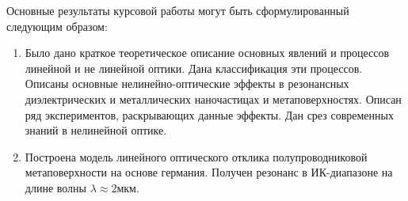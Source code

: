 

Основные результаты курсовой работы могут быть сформулированный следующим образом:
\begin{enumerate}
\item Было дано краткое теоретическое описание основных явлений и процессов линейной и не линейной оптики. Дана классификация эти процессов. Описаны основные нелинейно-оптические эффекты в резонансных диэлектрических и металлических наночастицах и метаповерхностях. Описан ряд экспериментов, раскрывающих данные эффекты.  Дан срез современных знаний в нелинейной оптике. 
\item Построена модель линейного оптического отклика полупроводниковой метаповерхности на основе германия.  Получен резонанс в ИК-диапазоне на длине волны $ \lambda \approx  2$мкм.  
\end{enumerate}
